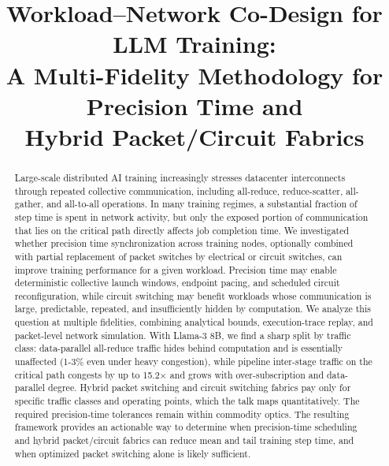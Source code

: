 \documentclass[conference]{IEEEtran}
\newcommand{\TODO}[1]{\textcolor{red}{[#1]}}
\begin{document}
\title{Workload--Network Co-Design for LLM Training:\\ A Multi-Fidelity Methodology for Precision Time and\\ Hybrid Packet/Circuit Fabrics}

\author{
\and
\IEEEauthorblockN{Ahmad \TODO{Surname}}
\IEEEauthorblockA{\textit{[Affiliation]}\\
\TODO{email}}}

\maketitle

\begin{abstract}
Large-scale distributed AI training increasingly stresses datacenter interconnects through repeated collective communication, including all-reduce, reduce-scatter, all-gather, and all-to-all operations. In many training regimes, a substantial fraction of step time is spent in network activity, but only the exposed portion of communication that lies on the critical path directly affects job completion time. We investigated whether precision time synchronization across training nodes, optionally combined with partial replacement of packet switches by electrical or circuit switches, can improve training performance for a given workload. Precision time may enable deterministic collective launch windows, endpoint pacing, and scheduled circuit reconfiguration, while circuit switching may benefit workloads whose communication is large, predictable, repeated, and insufficiently hidden by computation.  We analyze this question at multiple fidelities, combining analytical bounds, execution-trace replay, and packet-level network simulation. With Llama-3 8B, we find a sharp split by traffic class: data-parallel all-reduce traffic hides behind computation and is essentially unaffected (1-3\% even under heavy congestion), while pipeline inter-stage traffic on the critical path congests by up to 15.2$\times$ and grows with over-subscription and data-parallel degree. Hybrid packet switching and circuit switching fabrics pay only for specific traffic classes and operating points, which the talk maps quantitatively. The required precision-time tolerances remain within commodity optics. The resulting framework provides an actionable way to determine when precision-time scheduling and hybrid packet/circuit fabrics can reduce mean and tail training step time, and when optimized packet switching alone is likely sufficient.
\end{abstract}
\end{document}
